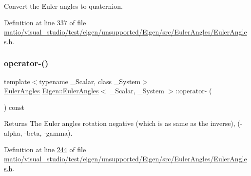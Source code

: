 Convert the Euler angles to quaternion. 

Definition at line \hyperlink{matio_2visual__studio_2test_2eigen_2unsupported_2_eigen_2src_2_euler_angles_2_euler_angles_8h_source_l00337}{337} of file \hyperlink{matio_2visual__studio_2test_2eigen_2unsupported_2_eigen_2src_2_euler_angles_2_euler_angles_8h_source}{matio/visual\+\_\+studio/test/eigen/unsupported/\+Eigen/src/\+Euler\+Angles/\+Euler\+Angles.\+h}.

\mbox{\label{class_eigen_1_1_euler_angles_a2a30e027e6f3fa275d7403c1c7e613af}} 
\subsubsection{\texorpdfstring{operator-\/()}{operator-()}\hspace{0.1cm}{\footnotesize\ttfamily [1/2]}}
{\footnotesize\ttfamily template$<$typename \+\_\+\+Scalar, class \+\_\+\+System$>$ \\
\hyperlink{class_eigen_1_1_euler_angles}{Euler\+Angles} \hyperlink{class_eigen_1_1_euler_angles}{Eigen\+::\+Euler\+Angles}$<$ \+\_\+\+Scalar, \+\_\+\+System $>$\+::operator-\/ (\begin{DoxyParamCaption}{ }\end{DoxyParamCaption}) const\hspace{0.3cm}{\ttfamily [inline]}}

\begin{DoxyReturn}{Returns}
The Euler angles rotation negative (which is as same as the inverse), (-\/alpha, -\/beta, -\/gamma). 
\end{DoxyReturn}


Definition at line \hyperlink{matio_2visual__studio_2test_2eigen_2unsupported_2_eigen_2src_2_euler_angles_2_euler_angles_8h_source_l00244}{244} of file \hyperlink{matio_2visual__studio_2test_2eigen_2unsupported_2_eigen_2src_2_euler_angles_2_euler_angles_8h_source}{matio/visual\+\_\+studio/test/eigen/unsupported/\+Eigen/src/\+Euler\+Angles/\+Euler\+Angles.\+h}.

\mbox{\label{class_eigen_1_1_euler_angles_a2a30e027e6f3fa275d7403c1c7e613af}} 
